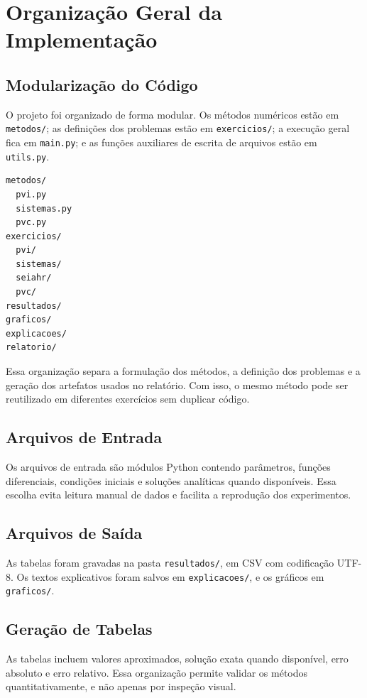 \section{Organização Geral da Implementação}

\subsection{Modularização do Código}

O projeto foi organizado de forma modular. Os métodos numéricos estão em \texttt{metodos/}; as definições dos problemas estão em \texttt{exercicios/}; a execução geral fica em \texttt{main.py}; e as funções auxiliares de escrita de arquivos estão em \texttt{utils.py}.

\begin{lstlisting}
metodos/
  pvi.py
  sistemas.py
  pvc.py
exercicios/
  pvi/
  sistemas/
  seiahr/
  pvc/
resultados/
graficos/
explicacoes/
relatorio/
\end{lstlisting}

Essa organização separa a formulação dos métodos, a definição dos problemas e a geração dos artefatos usados no relatório. Com isso, o mesmo método pode ser reutilizado em diferentes exercícios sem duplicar código.

\subsection{Arquivos de Entrada}

Os arquivos de entrada são módulos Python contendo parâmetros, funções diferenciais, condições iniciais e soluções analíticas quando disponíveis. Essa escolha evita leitura manual de dados e facilita a reprodução dos experimentos.

\subsection{Arquivos de Saída}

As tabelas foram gravadas na pasta \texttt{resultados/}, em CSV com codificação UTF-8. Os textos explicativos foram salvos em \texttt{explicacoes/}, e os gráficos em \texttt{graficos/}.

\subsection{Geração de Tabelas}

As tabelas incluem valores aproximados, solução exata quando disponível, erro absoluto e erro relativo. Essa organização permite validar os métodos quantitativamente, e não apenas por inspeção visual.

